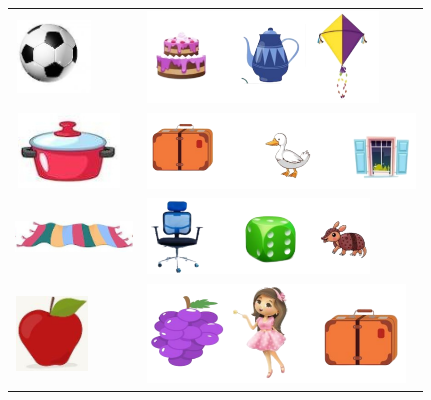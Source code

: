 \begin{tabular}{l|l}
\includegraphics[width=0.81250in,height=0.75903in]{media/image49.jpg} & \includegraphics[width=.65\textwidth]{media/image50a.png} \\
\includegraphics[width=1.12431in,height=0.78125in]{media/image53.jpg} & \includegraphics[width=.65\textwidth]{media/image50b.png} \\
\includegraphics[width=1.22986in,height=0.61458in]{media/image57.jpg} & \includegraphics[width=.65\textwidth]{media/image50c.png} \\
\includegraphics[width=0.77569in,height=0.78125in]{media/image61.jpg} & \includegraphics[width=.65\textwidth]{media/image50d.png}
\end{tabular}


